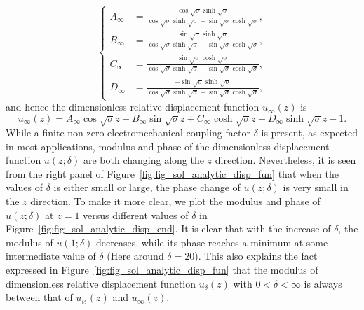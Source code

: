 \documentclass{svjour3}                     %
\begin{document}
\begin{equation}
    \left\{\begin{aligned}
        A_\infty &= \frac{ \cos\sqrt{\sigma } \sinh\sqrt{\sigma } }{ \cos\sqrt{\sigma } \sinh\sqrt{\sigma } + \sin\sqrt{\sigma } \cosh\sqrt{\sigma } }, \\
        B_\infty &= \frac{ \sin\sqrt{\sigma } \sinh\sqrt{\sigma } }{ \cos\sqrt{\sigma } \sinh\sqrt{\sigma } + \sin\sqrt{\sigma } \cosh\sqrt{\sigma } }, \\
        C_\infty &= \frac{ \sin\sqrt{\sigma } \cosh\sqrt{\sigma } }{ \cos\sqrt{\sigma } \sinh\sqrt{\sigma } + \sin\sqrt{\sigma } \cosh\sqrt{\sigma } }, \\
        D_\infty &= \frac{ - \sin\sqrt{\sigma } \sinh\sqrt{\sigma } }{ \cos\sqrt{\sigma } \sinh\sqrt{\sigma } + \sin\sqrt{\sigma } \cosh\sqrt{\sigma } },
    \end{aligned}\right.
    \label{eq:eq_disp_func_coeffs_exps_infty}
\end{equation}
and hence the dimensionless relative displacement function $u_{\infty} (z)$ is
\begin{equation}
    u_{\infty} (z) = A_{\infty} \cos{\sqrt{\sigma}z} + B_{\infty} \sin{\sqrt{\sigma}z} + C_{\infty} \cosh{\sqrt{\sigma}z} + D_{\infty} \sinh{\sqrt{\sigma}z} - 1.
\end{equation}
While a finite non-zero electromechanical coupling factor $\delta$ is present, as expected in most applications, modulus and phase of the dimensionless displacement function $u(z;\delta)$ are both changing along the $z$ direction. Nevertheless, it is seen from the right panel of Figure~\ref{fig:fig_sol_analytic_disp_fun} that when the values of $\delta$ is either small or large, the phase change of $u(z;\delta)$ is very small in the $z$ direction. To make it more clear, we plot the modulus and phase of $u(z;\delta)$ at $z=1$ versus different values of $\delta$ in Figure~\ref{fig:fig_sol_analytic_disp_end}. It is clear that with the increase of $\delta$, the modulus of $u(1;\delta)$ decreases, while its phase reaches a minimum at some intermediate value of $\delta$ (Here around $\delta = 20$). This also explains the fact expressed in Figure~\ref{fig:fig_sol_analytic_disp_fun} that the modulus of dimensionless relative displacement function $u_\delta (z)$ with $0 < \delta < \infty$ is always between that of $u_\varnothing (z)$ and $u_\infty (z)$.
\end{document}
